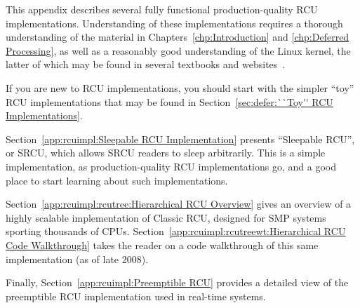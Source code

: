 

This appendix describes several fully functional production-quality RCU
implementations.
Understanding of these implementations requires a thorough understanding
of the material in
Chapters~\ref{chp:Introduction} and
\ref{chp:Deferred Processing},
as well as a reasonably good understanding of the Linux kernel,
the latter of which may be found in several textbooks and
websites~\cite{BovetCesati2005,CorbetRubiniKroahHartman,CorbetLWN,RobertLove2005}.

If you are new to RCU implementations, you should start with the
simpler ``toy'' RCU implementations that may be found in
Section~\ref{sec:defer:``Toy'' RCU Implementations}.

Section~\ref{app:rcuimpl:Sleepable RCU Implementation} presents
``Sleepable RCU'', or SRCU, which allows SRCU readers to sleep
arbitrarily.
This is a simple implementation, as production-quality RCU implementations
go, and a good place to start learning about such implementations.

Section~\ref{app:rcuimpl:rcutree:Hierarchical RCU Overview}
gives an overview of a highly scalable implementation of Classic
RCU, designed for SMP systems sporting thousands of CPUs.
Section~\ref{app:rcuimpl:rcutreewt:Hierarchical RCU Code Walkthrough}
takes the reader on a code walkthrough of this same implementation
(as of late 2008).

Finally,
Section~\ref{app:rcuimpl:Preemptible RCU}
provides a detailed view of the preemptible RCU implementation used
in real-time systems.





